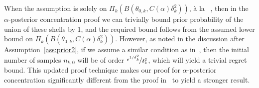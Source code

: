 \documentclass[11pt]{article}
\begin{document}
When the assumption is solely on $\Pi_k(B\left(\theta_{0,k}, C(\alpha)\delta_k^2 \right))$, {\`a} la ~\cite{bhattacharya2019bayesian, ZG}, then in the $\alpha$-posterior concentration proof we can trivially bound prior probability of the union of these shells by 1, and the required bound follows from the assumed lower bound on $\Pi_k(B(\theta_{0,k}, C(\alpha)\delta_k^2))$. However, as noted in the discussion after Assumption~\ref{ass:prior2}, if we assume a similar condition as in~\cite{bhattacharya2019bayesian,ZG}, then the initial number of samples $n_{k,0}$ will be of order $\nicefrac{e^{1/\delta_k^2}}{\delta_k^2}$, which will yield a trivial regret bound. This updated proof technique makes our proof for $\alpha$-posterior concentration significantly different from the proof in~\cite{bhattacharya2019bayesian} to yield a stronger result.
\end{document}

